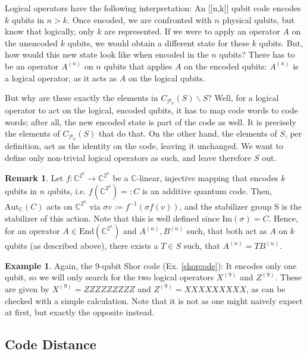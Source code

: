 \documentclass[12pt,a4paper,BCOR15mm,twoside,DIV12]{article}
\def\P{\mathcal{P}}
\def\C{\mathbb{C}}
\def\End{\text{End}}
\theoremstyle{definition}
\newtheorem{ex}[Satz]{Example}
\newtheorem{rem}[Satz]{Remark}
\begin{document}
Logical operators have the following interpretation:
An [[n,k]] qubit code encodes $k$ qubits in $n > k$. Once encoded, we are confronted with $n$ physical qubits, but know that logically, only $k$ are represented. If we were to apply an operator $A$ on the unencoded $k$ qubits, 
we would obtain a different state for these $k$ qubits. But, how would this new state look like when encoded in the $n$ qubits? There has to be an operator $A^{(n)}$ on $n$ qubits that applies $A$ on the encoded qubits: $A^{(n)}$ is a logical
operator, as it acts as $A$ on the logical qubits.

But why are these exactly the elements in $C_{\P_n}(S) \backslash S$? Well, for a logical operator to act on the logical, encoded qubits, it has to map code words to code words; after all, the new encoded state is part of the code as well.
It is precisely the elements of $C_{\P_n}(S)$ that do that. On the other hand, the elements of $S$, per definition, act as the identity on the code, leaving it unchanged. We want to define only non-trivial logical operators as such, and leave therefore $S$ out.

\begin{rem}
Let $f: \C^{2^k} \rightarrow \C^{2^n}$ be a $\C$-linear, injective mapping that encodes $k$ qubits in $n$ qubits, i.e. $f(\C^{2^k})=:C$ is an additive quantum code. Then, $\text{Aut}_\C(C)$ acts on $\C^{2^k}$ via $\sigma v:= f^{-1}(\sigma f(v))$, and the stabilizer group S is the stabilizer of this action.
Note that this is well defined since Im$(\sigma) = C$. Hence, for an operator $A \in \End(\C^{2^n})$ and  $A^{(n)}, B^{(n)}$ such, that both act as $A$ on $k$ qubits (as described above), there exists a $T \in S$ such, that $A^{(n)} = T B^{(n)}$.

\end{rem}

\begin{ex}
Again, the 9-qubit Shor code (Ex.  \ref{shorcode}): It encodes only one qubit, so we will only search for the two logical operators $X^{(9)}$ and $Z^{(9)}$. These are given by $X^{(9)} = ZZZZZZZZZ$ and $Z^{(9)} = XXXXXXXXX$, as can be checked with a simple calculation. Note that it is not as one might naively expect at first, but exactly the opposite instead.
\end{ex}

\subsection{Code Distance}
\end{document}
